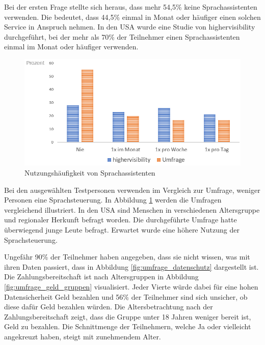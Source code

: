 Bei der ersten Frage stellte sich heraus, dass mehr 54,5\% keine Sprachassistenten verwenden. Die bedeutet, dass 44,5\% einmal in Monat oder häufiger einen solchen Service in Anspruch nehmen. In den USA wurde eine Studie von highervisibility durchgeführt, bei der mehr als 70\% der Teilnehmer einen Sprachassistenten einmal im Monat oder häufiger verwenden\cite{highervisibility}.

\begin{figure}[h!]
	\centering
	\includegraphics[width=0.7\linewidth]{Picture/umfrage_haeufigkeit}
	\caption[Nutzungshäufigkeit von Sprachassistenten]{Nutzungshäufigkeit von Sprachassistenten}
	\label{fig:umfrage_haeufigkeit}
\end{figure}

Bei den ausgewählten Testpersonen verwenden im Vergleich zur Umfrage, weniger Personen eine Sprachsteuerung. In Abbildung \ref{fig:umfrage_haeufigkeit} werden die Umfragen vergleichend illustriert. In den USA sind Menschen in verschiedenen Altersgruppe und regionaler Herkunft befragt worden. Die durchgeführte Umfrage hatte überwiegend junge Leute befragt. Erwartet wurde eine höhere Nutzung der Sprachsteuerung. 


Ungefähr 90\% der Teilnehmer haben angegeben, dass sie nicht wissen, was mit ihren Daten passiert, dass in Abbildung \ref{fig:umfrage_datenschutz} dargestellt ist. Die Zahlungsbereitschaft ist nach Altersgruppen in Abbildung \ref{fig:umfrage_geld_gruppen}  visualisiert. Jeder Vierte würde dabei für eine hohen Datensicherheit Geld bezahlen und 56\% der Teilnehmer sind sich unsicher, ob diese dafür Geld bezahlen würden. Die Altersbetrachtung nach der Zahlungsbereitschaft zeigt, dass die Gruppe unter 18 Jahren weniger bereit ist, Geld zu bezahlen. Die Schnittmenge der Teilnehmern, welche Ja oder vielleicht angekreuzt haben, steigt mit zunehmendem Alter.

